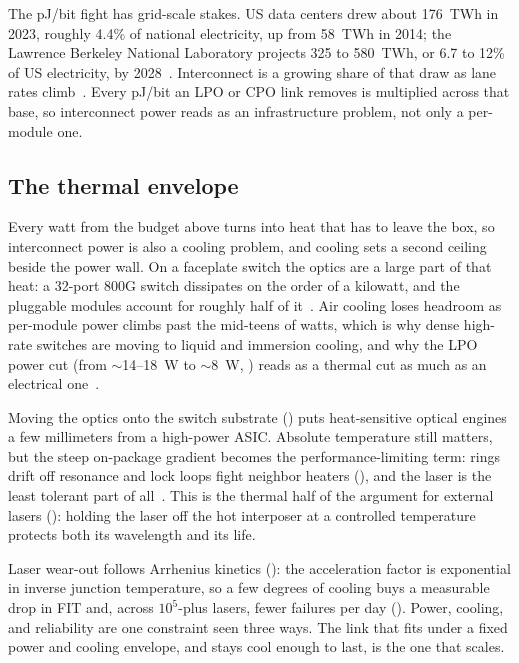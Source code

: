 The pJ/bit fight has grid-scale
stakes. US data centers drew about 176~TWh in 2023, roughly 4.4\% of national
electricity, up from 58~TWh in 2014; the Lawrence Berkeley National Laboratory
projects 325 to 580~TWh, or 6.7 to 12\% of US electricity, by
2028~. Interconnect is a growing share of that draw as lane
rates climb~\cite{lpo}. Every pJ/bit an LPO or CPO link removes is multiplied
across that base, so interconnect power reads as an infrastructure problem, not
only a per-module one.

\subsection{The thermal envelope}
\label{sec:thermal-envelope}

Every watt from the budget above turns into heat that has to leave the box, so
interconnect power is also a cooling problem, and cooling sets a second ceiling
beside the power wall. On a faceplate switch the optics are a large part of that
heat: a 32-port 800G switch dissipates on the order of a kilowatt, and the
pluggable modules account for roughly half of it~. Air
cooling loses headroom as per-module power climbs past the mid-teens of watts,
which is why dense high-rate switches are moving to liquid and immersion cooling,
and why the LPO power cut (from $\sim$14--18~W to $\sim$8~W, )
reads as a thermal cut as much as an electrical one~\cite{lpo}.

 Moving the optics onto
the switch substrate () puts heat-sensitive optical engines a
few millimeters from a high-power ASIC. Absolute temperature still matters, but the
steep on-package gradient becomes the performance-limiting term: rings drift off
resonance and lock loops fight neighbor heaters (), and the
laser is the least tolerant part of all~. This is the thermal
half of the argument for external lasers (): holding the laser off
the hot interposer at a controlled temperature protects both its wavelength and its
life.

 Laser wear-out
follows Arrhenius kinetics (): the acceleration factor is
exponential in inverse junction temperature, so a few degrees of cooling buys a
measurable drop in FIT and, across $10^5$-plus lasers, fewer failures per day
(). Power, cooling, and reliability are one constraint seen
three ways. The link that fits under a fixed power and cooling envelope, and stays
cool enough to last, is the one that scales.

